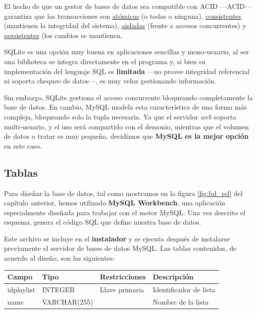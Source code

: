 El hecho de que un gestor de bases de datos sea compatible con \acrshort{ACID} ---\acrlong{ACID}--- garantiza que las transacciones son \underline{atómicas} (o todas o ninguna), \underline{consistentes} (mantienen la integridad del sistema), \underline{aisladas} (frente a accesos concurrentes) y \underline{persistentes} (los cambios se mantienen. \cite{wiki_acid}

SQLite es una opción muy buena en aplicaciones sencillas y mono-usuario, al ser una biblioteca se integra directamente en el programa y, si bien su implementación del lenguaje \acrshort{SQL} es \textbf{limitada} ---no provee integridad referencial ni soporta chequeo de datos---, es muy veloz gestionando información.

Sin embargo, SQLite gestiona el acceso concurrente bloqueando completamente la base de datos. En cambio, MySQL modela esta característica de una forma más compleja, bloqueando solo la tupla necesaria. Ya que el servidor \textit{web} soporta multi-usuario, y el uso será compartido con el demonio, mientras que el volumen de datos a tratar es muy pequeño, decidimos que \textbf{MySQL es la mejor opción} en este caso.

\subsection{Tablas}

Para diseñar la base de datos, tal como mostramos en la figura \ref{fig:bd_rel} del capítulo anterior, hemos utilizado \textbf{MySQL Workbench}, una aplicación especialmente diseñada para trabajar con el motor MySQL. Una vez descrito el esquema, genera el código \acrshort{SQL} que define nuestra base de datos.

Este archivo se incluye en el \textbf{instalador} y se ejecuta después de instalarse previamente el servidor de bases de datos MySQL. Las tablas contenidas, de acuerdo al diseño, son las siguientes:

\smallskip

\begin{center}
	\begin{tabular}{|l|l|l|l|}
		\hline \textbf{Campo} & \textbf{Tipo} & \textbf{Restricciones} & \textbf{Descripción} \\ 
		\hline idplaylist & INTEGER & Llave primaria & Identificador de lista \\ 
		\hline name & VARCHAR(255) & & Nombre de la lista \\ 
		\hline 
	\end{tabular}
	\smallskip
\end{center}

